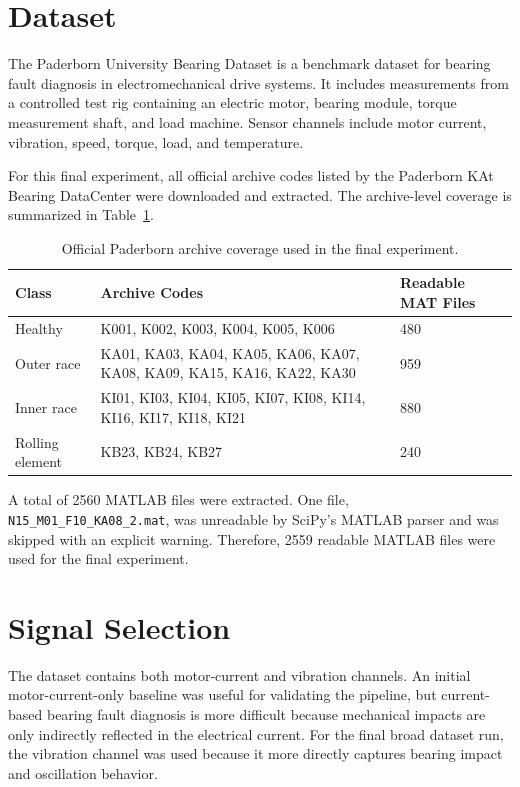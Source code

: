 \documentclass[11pt,a4paper]{article}
\begin{document}
\section{Dataset}
The Paderborn University Bearing Dataset is a benchmark dataset for bearing fault diagnosis in electromechanical drive systems. It includes measurements from a controlled test rig containing an electric motor, bearing module, torque measurement shaft, and load machine. Sensor channels include motor current, vibration, speed, torque, load, and temperature.

For this final experiment, all official archive codes listed by the Paderborn KAt Bearing DataCenter were downloaded and extracted. The archive-level coverage is summarized in Table~\ref{tab:archivecoverage}.

\begin{table}[H]
\centering
\caption{Official Paderborn archive coverage used in the final experiment.}
\label{tab:archivecoverage}
\begin{tabular}{lll}
\toprule
\textbf{Class} & \textbf{Archive Codes} & \textbf{Readable MAT Files} \\
\midrule
Healthy & K001, K002, K003, K004, K005, K006 & 480 \\
Outer race & KA01, KA03, KA04, KA05, KA06, KA07, KA08, KA09, KA15, KA16, KA22, KA30 & 959 \\
Inner race & KI01, KI03, KI04, KI05, KI07, KI08, KI14, KI16, KI17, KI18, KI21 & 880 \\
Rolling element & KB23, KB24, KB27 & 240 \\
\bottomrule
\end{tabular}
\end{table}

A total of 2560 MATLAB files were extracted. One file, \texttt{N15\_M01\_F10\_KA08\_2.mat}, was unreadable by SciPy's MATLAB parser and was skipped with an explicit warning. Therefore, 2559 readable MATLAB files were used for the final experiment.

\section{Signal Selection}
The dataset contains both motor-current and vibration channels. An initial motor-current-only baseline was useful for validating the pipeline, but current-based bearing fault diagnosis is more difficult because mechanical impacts are only indirectly reflected in the electrical current. For the final broad dataset run, the vibration channel was used because it more directly captures bearing impact and oscillation behavior.
\end{document}
